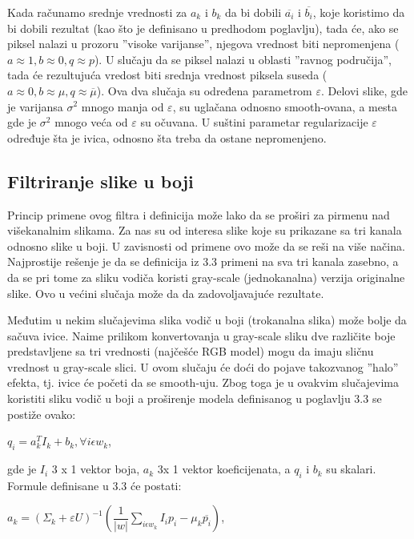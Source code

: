\documentclass[a4paper,12pt,titlepage]{article}
\begin{document}
Kada računamo srednje vrednosti za $a_k$ i $b_k$ da bi dobili $\overline{a_i}$ i $\overline{b_i}$, koje koristimo da bi dobili rezultat (kao što je definisano u predhodom poglavlju), tada će, ako se piksel nalazi u prozoru ''visoke varijanse'', njegova vrednost biti nepromenjena ($a \approx 1, b \approx 0, q \approx p$). U slučaju da se piksel nalazi u oblasti ''ravnog područija'', tada će rezultujuća vredost biti srednja vrednost piksela suseda ($a \approx 0, b \approx \mu, q \approx \overline{\mu}$). Ova dva slučaja su određena parametrom $\varepsilon$. Delovi slike, gde je varijansa $\sigma^2$ mnogo manja od $\varepsilon$, su uglačana odnosno smooth-ovana, a mesta gde je $\sigma^2$ mnogo veća od $\varepsilon$ su očuvana. U suštini parametar regularizacije $\varepsilon$ određuje šta je ivica, odnosno šta treba da ostane nepromenjeno.   

\subsection{Filtriranje slike u boji}%

Princip primene ovog filtra i definicija može lako da se proširi za pirmenu nad višekanalnim slikama. Za nas su od interesa slike koje su prikazane sa tri kanala  odnosno slike u boji. U zavisnosti od primene ovo može da se reši na više načina. Najprostije rešenje je da se definicija iz 3.3 primeni na sva tri kanala zasebno, a da se pri tome za sliku vodiča koristi gray-scale (jednokanalna) verzija originalne slike. Ovo u većini slučaja može da da zadovoljavajuće rezultate. 

Međutim u nekim slučajevima slika vodič u boji (trokanalna slika) može bolje da sačuva ivice. Naime prilikom konvertovanja u gray-scale sliku dve različite boje predstavljene sa tri vrednosti (najčešće RGB model) mogu da imaju sličnu vrednost u gray-scale slici. U ovom slučaju će doći do pojave takozvanog ''halo'' efekta, tj. ivice će početi da se smooth-uju. Zbog toga je u ovakvim slučajevima koristiti sliku vodič u boji a proširenje modela definisanog u poglavlju 3.3 se postiže ovako:

\begin{center}
	$q_i = a_k^T I_k + b_k, \forall i \epsilon w_k$,
\end{center}   

gde je $I_i$ 3 x 1 vektor boja, $a_k$ 3x 1 vektor koeficijenata, a $q_i$ i $b_k$ su skalari. Formule definisane u 3.3 će postati:

\begin{center}
	$a_k = (\Sigma_k + \varepsilon U)^{-1} (\dfrac{1}{|w|} \sum_{i \epsilon w_k} I_i p_i - \mu_k \overline{p_i})$,
\end{center}
\end{document}
